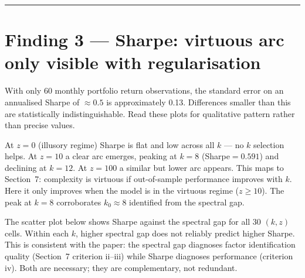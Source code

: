 \documentclass[11pt,a4paper]{article}
\begin{document}
\noindent\rule{\textwidth}{0.4pt}

\section*{Finding 3 — Sharpe: virtuous arc only visible with regularisation}

{\small\color{cgray}
With only 60 monthly portfolio return observations, the standard error on an
annualised Sharpe of $\approx 0.5$ is approximately 0.13.
Differences smaller than this are statistically indistinguishable.
Read these plots for qualitative pattern rather than precise values.}

\medskip
At $z=0$ (illusory regime) Sharpe is flat and low across all $k$ — no $k$ selection
helps. At $z=10$ a clear arc emerges, peaking at $k=8$ (Sharpe$=0.591$) and
declining at $k=12$. At $z=100$ a similar but lower arc appears. This maps to
Section~7: complexity is virtuous if out-of-sample performance improves with $k$.
Here it only improves when the model is in the virtuous regime ($z\geq 10$).
The peak at $k=8$ corroborates $k_0\approx 8$ identified from the spectral gap.

The scatter plot below shows Sharpe against the spectral gap for all 30 $(k,z)$ cells.
Within each $k$, higher spectral gap does not reliably predict higher Sharpe.
This is consistent with the paper: the spectral gap diagnoses factor identification
quality (Section~7 criterion ii--iii) while Sharpe diagnoses performance (criterion iv).
Both are necessary; they are complementary, not redundant.
\end{document}

